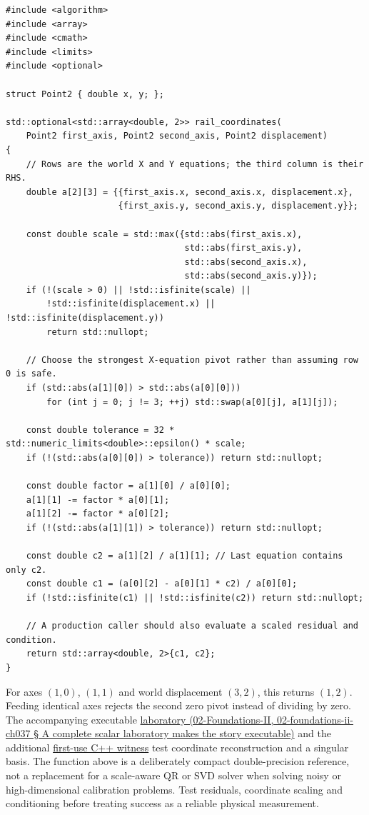 \begin{verbatim}
#include <algorithm>
#include <array>
#include <cmath>
#include <limits>
#include <optional>

struct Point2 { double x, y; };

std::optional<std::array<double, 2>> rail_coordinates(
    Point2 first_axis, Point2 second_axis, Point2 displacement)
{
    // Rows are the world X and Y equations; the third column is their RHS.
    double a[2][3] = {{first_axis.x, second_axis.x, displacement.x},
                      {first_axis.y, second_axis.y, displacement.y}};

    const double scale = std::max({std::abs(first_axis.x),
                                   std::abs(first_axis.y),
                                   std::abs(second_axis.x),
                                   std::abs(second_axis.y)});
    if (!(scale > 0) || !std::isfinite(scale) ||
        !std::isfinite(displacement.x) || !std::isfinite(displacement.y))
        return std::nullopt;

    // Choose the strongest X-equation pivot rather than assuming row 0 is safe.
    if (std::abs(a[1][0]) > std::abs(a[0][0]))
        for (int j = 0; j != 3; ++j) std::swap(a[0][j], a[1][j]);

    const double tolerance = 32 * std::numeric_limits<double>::epsilon() * scale;
    if (!(std::abs(a[0][0]) > tolerance)) return std::nullopt;

    const double factor = a[1][0] / a[0][0];
    a[1][1] -= factor * a[0][1];
    a[1][2] -= factor * a[0][2];
    if (!(std::abs(a[1][1]) > tolerance)) return std::nullopt;

    const double c2 = a[1][2] / a[1][1]; // Last equation contains only c2.
    const double c1 = (a[0][2] - a[0][1] * c2) / a[0][0];
    if (!std::isfinite(c1) || !std::isfinite(c2)) return std::nullopt;

    // A production caller should also evaluate a scaled residual and condition.
    return std::array<double, 2>{c1, c2};
}
\end{verbatim}

For axes \((1,0)\), \((1,1)\) and world displacement \((3,2)\), this returns \((1,2)\). Feeding identical axes rejects the second zero pivot instead of dividing by zero. The accompanying executable \href{}{laboratory (02-Foundations-II, 02-foundations-ii-ch037 § A complete scalar laboratory makes the story executable)} and the additional \href{../../tools/labs/first_use_contract_lab.cpp}{first-use C++ witness} test coordinate reconstruction and a singular basis. The function above is a deliberately compact double-precision reference, not a replacement for a scale-aware QR or SVD solver when solving noisy or high-dimensional calibration problems. Test residuals, coordinate scaling and conditioning before treating success as a reliable physical measurement.

